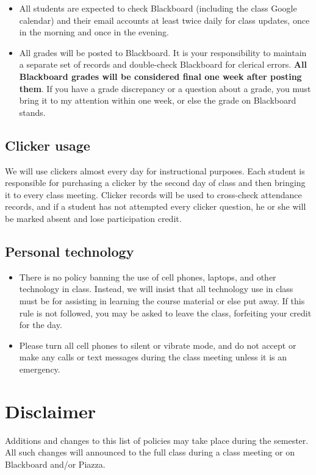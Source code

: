\documentclass[11pt]{article}
\begin{document}
\begin{itemize}[itemsep=0pt]
	\item All students are expected to check Blackboard (including the class Google calendar) and their email accounts at least twice daily for class updates, once in the morning and once in the evening. 
	\item All grades will be posted to Blackboard. It is your responsibility to maintain a separate set of records and double-check Blackboard for clerical errors. \textbf{All Blackboard grades will be considered final one week after posting them}. If you have a grade discrepancy or a question about a grade, you must bring it to my attention within one week, or else the grade on Blackboard stands. 
\end{itemize}


\subsection{Clicker usage}

We will use clickers almost every day for instructional purposes. Each student is responsible for purchasing a clicker by the second day of class and then bringing it to every class meeting. Clicker records will be used to cross-check attendance records, and if a student has not attempted every clicker question, he or she will be marked absent and lose participation credit. 

\subsection{Personal technology}

\begin{itemize}[itemsep=0pt]
	\item There is no policy banning the use of cell phones, laptops, and other technology in class. Instead, we will insist that all technology use in class must be for assisting in learning the course material or else put away. If this rule is not followed, you may be asked to leave the class, forfeiting your credit for the day.
	\item Please turn all cell phones to silent or vibrate mode, and do not accept or make any calls or text messages during the class meeting unless it is an emergency.
\end{itemize}


\section{Disclaimer}

Additions and changes to this list of policies may take place during the semester. All such changes will announced to the full class during a class meeting or on Blackboard and/or Piazza.
\end{document}
